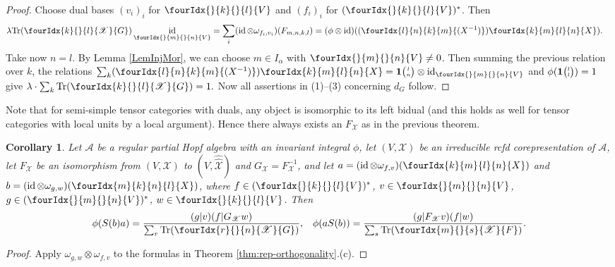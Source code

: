 \documentclass[10pt]{article}
\DeclareMathOperator{\id}{id}
\newcommand{\dual}[1]{#1^{*}}
\newcommand{\dualco}[1]{\hat{#1}}
\newcommand{\Tr}{\mathrm{Tr}}
\newcommand{\Grt}[3]{#1{\tiny {\begin{pmatrix} #2\\#3\end{pmatrix}}}}
\newcommand{\UnitC}[2]{\Grt{\mathbf{1}}{#1}{#2}}
\newcommand{\Gr}[5]{\fourIdx{#2}{#4}{#3}{#5}{#1}}%
\newcommand{\Gru}[3]{\Gr{#1}{}{}{#2}{#3}}
\newtheorem{Cor}[Theorem]{Corollary}
\theoremstyle{definition}
\numberwithin{equation}{section}
\begin{document}
\begin{proof}
  Choose dual  bases
  $(v_{i})_{i}$ for $\Gru{V}{k}{l}$ and $(f_{i})_{i}$ for  $\dual{(\Gru{V}{k}{l})}$. Then
  \begin{align*}
    \lambda   \Tr( \Gr{G}{k}{l}{}{\mathscr{X}}) \id_{\Gru{V}{m}{n}}
 &= \sum_{i} (\id \otimes
    \omega_{f_{i},v_{i}})(F_{m,n,k,l}) = (\phi \otimes
    \id)((\Gr{(X^{-1})}{l}{k}{n}{m}) \Gr{X}{k}{l}{m}{n}).
  \end{align*}
  Take now $n=l$.  By Lemma \ref{LemInjMor}, we can choose $m\in I_{\alpha}$ with $\Gru{V}{m}{n}\neq 0$.   Then summing the previous relation over $k$, the relations $\sum_{k}
  (\Gr{(X^{-1})}{l}{k}{n}{m}) \Gr{X}{k}{l}{m}{n} = \UnitC{l}{n}
  \otimes \id_{\Gru{V}{m}{n}}$ and
  $\phi(\UnitC{l}{l})=1$ give $\lambda \cdot  \sum_{k} \Tr(\Gr{G}{k}{l}{}{\mathscr{X}}) = 1.$
Now all assertions in (1)--(3) concerning $d_G$ follow.
\end{proof}

Note that for semi-simple tensor categories with duals, any object is isomorphic to its left bidual (and this holds as well for tensor categories with local units by a local argument). Hence there always exists an $F_{\mathscr{X}}$ as in the previous theorem. 

\begin{Cor}\label{CorOrth}
  Let $\mathscr{A}$ be a regular partial Hopf algebra with an invariant integral $\phi$, let
  $(V,\mathscr{X})$ be an irreducible rcfd corepresentation of
  $\mathscr{A}$, let $F_{\mathscr{X}}$ be an isomorphism from
  $(V,\mathscr{X})$ to $(V,\dualco{\dualco{\mathscr{X}}})$ and
  $G_{\mathscr{X}}=F^{-1}_{{\mathscr{X}}}$, and let $a=(\id \otimes
  \omega_{f,v})(\Gr{X}{k}{l}{m}{n})$ and $b=(\id \otimes
  \omega_{g,w})(\Gr{X}{m}{n}{k}{l})$, where 
  $f \in   \dual{(\Gru{V}{k}{l})}$, $v \in\Gru{V}{m}{n}$, $g \in
  \dual{(\Gru{V}{m}{n})}$, $w \in  \Gru{V}{k}{l}$.  Then
\begin{align*}
  \phi(S(b)a) &= \frac{(g|v)(f|G_{\mathscr{X}}w)}{\sum_{r}
    \Tr(\Gr{G}{r}{n}{}{\mathscr{X}})}, & \phi(aS(b)) = \frac{(g|F_{\mathscr{X}}v)(f|w)}{\sum_{s}
    \Tr(\Gr{F}{m}{s}{}{\mathscr{X}})}.
\end{align*}
\end{Cor}
\begin{proof}
Apply $\omega_{g,w} \otimes
    \omega_{f,v}$ to the formulas in  Theorem
    \ref{thm:rep-orthogonality}.(c).
\end{proof}
\end{document}
